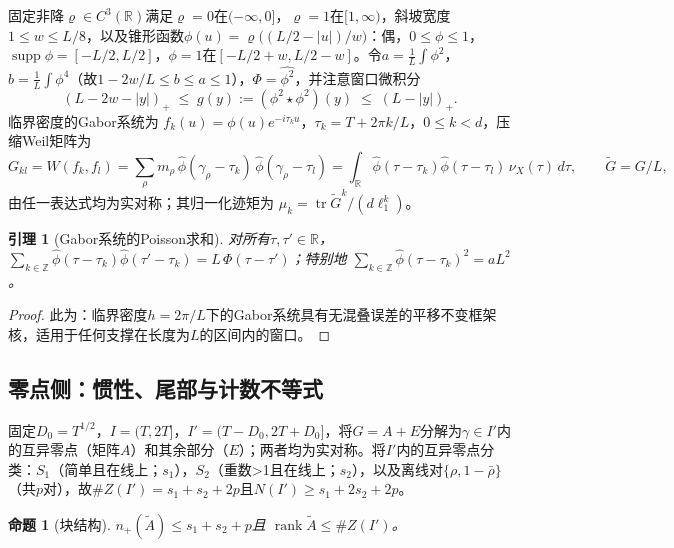 \documentclass[11pt]{article}
\numberwithin{equation}{section}
\newtheorem{lemma}[theorem]{引理}
\newtheorem{proposition}[theorem]{命题}
\theoremstyle{definition}
\theoremstyle{remark}
\begin{document}
固定非降$\varrho\in C^{3}(\mathbb R)$满足$\varrho=0$在$(-\infty,0]$，$\varrho=1$在$[1,\infty)$，斜坡宽度$1\le w\le L/8$，以及锥形函数$\phi(u)=\varrho\bigl((L/2-|u|)/w\bigr)$：偶，$0\le\phi\le1$，$\operatorname{supp}\phi=[-L/2,L/2]$，$\phi=1$在$[-L/2+w,L/2-w]$。令$a=\tfrac1L\int\phi^{2}$，$b=\tfrac1L\int\phi^{4}$（故$1-2w/L\le b\le a\le1$），$\Phi=\widehat{\phi^{2}}$，并注意窗口微积分
\begin{equation}\label{e:windowcalc}
(L-2w-|y|)_+\;\le\;g(y):=(\phi^{2}\star\phi^{2})(y)
\;\le\;(L-|y|)_+ .
\end{equation}
临界密度的Gabor系统为
$f_k(u)=\phi(u)e^{-i\tau_ku}$，$\tau_k=T+2\pi k/L$，$0\le k<d$，压缩Weil矩阵为
\[
G_{kl}=W(f_k,f_l)
=\sum_\rho m_\rho\,\widehat\phi(\gamma_\rho-\tau_k)\,
\widehat\phi(\gamma_\rho-\tau_l)
=\int_{\mathbb R}\widehat\phi(\tau-\tau_k)
\widehat\phi(\tau-\tau_l)\,\nu_X(\tau)\,d\tau,
\qquad\widetilde G=G/L,
\]
由任一表达式均为实对称；其归一化迹矩为
$\mu_k=\operatorname{tr}\widetilde G^{k}/(d\ell_1^{k})$。

\begin{lemma}[Gabor系统的Poisson求和]\label{l:gabor}
对所有$\tau,\tau'\in\mathbb R$，
$\sum_{k\in\mathbb Z}\widehat\phi(\tau-\tau_k)
\widehat\phi(\tau'-\tau_k)=L\,\Phi(\tau-\tau')$；特别地
$\sum_{k\in\mathbb Z}
\widehat\phi(\tau-\tau_k)^{2}=aL^{2}$。
\end{lemma}

\begin{proof}
此为\cite[引理2.2]{C26}：临界密度$h=2\pi/L$下的Gabor系统具有无混叠误差的平移不变框架核，适用于任何支撑在长度为$L$的区间内的窗口。
\end{proof}

\subsection{零点侧：惯性、尾部与计数不等式}\label{s:frame:count}

固定$D_0=T^{1/2}$，$I=(T,2T]$，$I'=(T-D_0,2T+D_0]$，将$G=A+E$分解为$\gamma\in I'$内的互异零点（矩阵$A$）和其余部分（$E$）；两者均为实对称。将$I'$内的互异零点分类：$S_1$（简单且在线上；$s_1$），$S_2$（重数>1且在线上；$s_2$），以及离线对$\{\rho,1-\bar\rho\}$（共$p$对），故$\#Z(I')=s_1+s_2+2p$且$N(I')\ge s_1+2s_2+2p$。

\begin{proposition}[块结构]\label{p:inertiaA}
$n_+(\widetilde A)\le s_1+s_2+p$且
$\operatorname{rank}\widetilde A\le\#Z(I')$。
\end{proposition}
\end{document}
